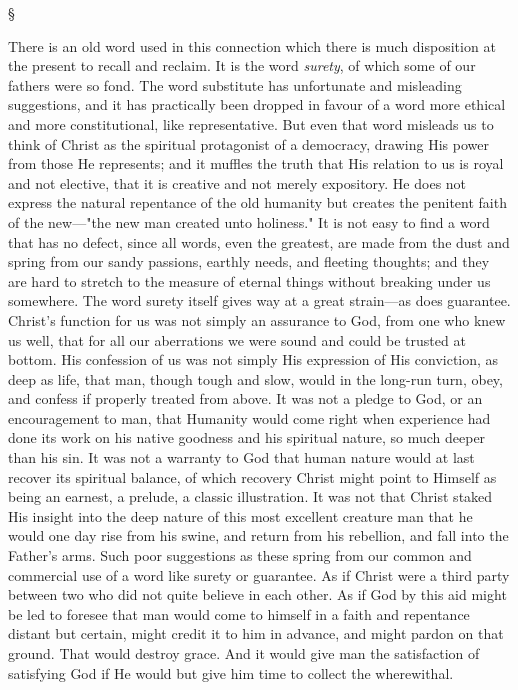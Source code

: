 \documentclass[12pt,letterpaper,oneside]{book}
\begin{document}
\begin{center}
\S
\end{center}

There is an old word used in this connection 
which there is much disposition at the present 
to recall and reclaim. It is the word \textit{surety}, of 
which some of our fathers were so fond. The 
word substitute has unfortunate and misleading 
suggestions, and it has practically been dropped 
in favour of a word more ethical and more constitutional, 
like representative. But even that 
word misleads us to think of Christ as the 
spiritual protagonist of a democracy, drawing 
His power from those He represents; and it 
muffles the truth that His relation to us is royal 
and not elective, that it is creative and not 
merely expository. He does not express the 
natural repentance of the old humanity but 
creates the penitent faith of the new---"the 
new man created unto holiness." It is not 
easy to find a word that has no defect, since 
all words, even the greatest, are made from 
the dust and spring from our sandy passions, 
earthly needs, and fleeting thoughts; and they 
are hard to stretch to the measure of eternal 
things without breaking under us somewhere. 
The word surety itself gives way at a great 
strain---as does guarantee. Christ's function for 
us was not simply an assurance to God, from one 
who knew us well, that for all our aberrations 
we were sound and could be trusted at bottom. 
His confession of us was not simply His 
expression of His conviction, as deep as life, 
that man, though tough and slow, would in 
the long-run turn, obey, and confess if properly 
treated from above. It was not a pledge to God, 
or an encouragement to man, that Humanity 
would come right when experience had done its 
work on his native goodness and his spiritual 
nature, so much deeper than his sin. It was not 
a warranty to God that human nature would 
at last recover its spiritual balance, of which 
recovery Christ might point to Himself as being 
an earnest, a prelude, a classic illustration. It 
was not that Christ staked His insight into the 
deep nature of this most excellent creature man 
that he would one day rise from his swine, and return 
from his rebellion, and fall into the Father's 
arms. Such poor suggestions as these spring 
from our common and commercial use of a word 
like surety or guarantee. As if Christ were a 
third party between two who did not quite believe 
in each other. As if God by this aid might be 
led to foresee that man would come to himself 
in a faith and repentance distant but certain, 
might credit it to him in advance, and might 
pardon on that ground. That would destroy 
grace. And it would give man the satisfaction 
of satisfying God if He would but give him time 
to collect the wherewithal. 
\end{document}
